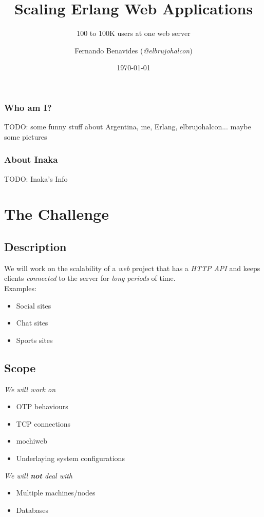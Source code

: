 \documentclass[utf8]{beamer}
\begin{document}
\title{Scaling Erlang Web Applications}
\subtitle{100 to 100K users at one web server}
\author{Fernando Benavides (\textit{@elbrujohalcon})}
\date{\today}

\frame{\titlepage} 

\begin{frame}
	\frametitle{Who am I?}
	TODO: some funny stuff about Argentina, me, Erlang, elbrujohalcon... maybe some pictures
\end{frame}

\begin{frame}
	\frametitle{About Inaka}
	TODO: Inaka's Info
\end{frame}


\section{The Challenge}
\subsection{Description}
\begin{frame}
	We will work on the scalability of a \emph{web} project \pause that has a \emph{HTTP API} \pause and keeps clients \emph{connected} to the server \pause for \emph{long periods} of time.\\
\pause Examples:
	\begin{itemize}
		\item Social sites
		\item Chat sites
		\item Sports sites
	\end{itemize}
\end{frame}

\subsection{Scope}
\begin{frame}
	\emph{We will work on}
	\begin{itemize}
		\item OTP behaviours
		\item TCP connections
		\item mochiweb
		\item Underlaying system configurations
	\end{itemize}
	\pause
	\emph{We will \textbf{not} deal with}
	\begin{itemize}
		\item Multiple machines/nodes
		\item Databases
	\end{itemize}
\end{frame}
\end{document}
